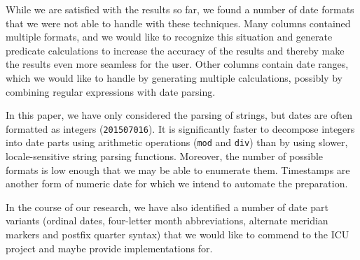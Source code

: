 While we are satisfied with the results so far, we found a number of date formats that we were not able to handle with these techniques. Many columns contained multiple formats, and we would like to recognize this situation and generate predicate calculations to increase the accuracy of the results and thereby make the results even more seamless for the user. Other columns contain date ranges, which we would like to handle by generating multiple calculations, possibly by combining regular expressions with date parsing.

In this paper, we have only considered the parsing of strings, but dates are often formatted as integers (\eg \texttt{201507016}). It is significantly faster to decompose integers into date parts using arithmetic operations (\eg \texttt{mod} and \texttt{div}) than by using slower, locale-sensitive string parsing functions. Moreover, the number of possible formats is low enough that we may be able to enumerate them. Timestamps are another form of numeric date for which we intend to automate the preparation.

In the course of our research, we have also identified a number of date part variants (\eg ordinal dates, four-letter month abbreviations, alternate meridian markers and postfix quarter syntax) that we would like to commend to the ICU project and maybe provide implementations for.
